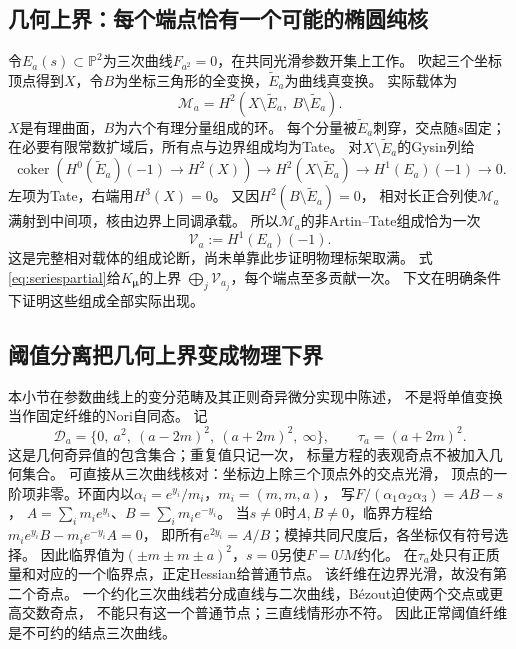 \documentclass[11pt,a4paper]{ctexart}
\theoremstyle{cnplain}\newtheorem{theorem}{定理}[section]
\theoremstyle{definition}\newtheorem{definition}[theorem]{定义}
\theoremstyle{remark}\newtheorem{remark}[theorem]{注}
\begin{document}
\subsection{几何上界：每个端点恰有一个可能的椭圆纯核}
令$E_a(s)\subset\mathbb P^2$为三次曲线$F_{a^2}=0$，在共同光滑参数开集上工作。
吹起三个坐标顶点得到$X$，令$B$为坐标三角形的全变换，$\widetilde E_a$为曲线真变换。
实际载体为
\[
 \mathcal M_a
 =H^2(X\setminus\widetilde E_a,\ B\setminus\widetilde E_a).
\]
$X$是有理曲面，$B$为六个有理分量组成的环。
每个分量被$\widetilde E_a$刺穿，交点随$s$固定；
在必要有限常数扩域后，所有点与边界组成均为Tate。
对$X\setminus\widetilde E_a$的Gysin列给
\[
 \operatorname{coker}\!\left(H^0(\widetilde E_a)(-1)\to H^2(X)\right)
 \longrightarrow H^2(X\setminus\widetilde E_a)
 \longrightarrow H^1(E_a)(-1)\longrightarrow0.
\]
左项为Tate，右端用$H^3(X)=0$。
又因$H^2(B\setminus\widetilde E_a)=0$，
相对长正合列使$\mathcal M_a$满射到中间项，核由边界上同调承载。
所以$\mathcal M_a$的非Artin--Tate组成恰为一次
\[
 \mathcal V_a:=H^1(E_a)(-1).
\]
这是完整相对载体的组成论断，尚未单靠此步证明物理标架取满。
式\eqref{eq:seriespartial}给$K_{\boldsymbol\mu}$的上界
$\bigoplus_j\mathcal V_{a_j}$，每个端点至多贡献一次。
下文在明确条件下证明这些组成全部实际出现。

\subsection{阈值分离把几何上界变成物理下界}
本小节在参数曲线上的变分范畴及其正则奇异微分实现中陈述，
不是将单值变换当作固定纤维的Nori自同态。
记
\[
 \mathcal D_a=\{0,\ a^2,\ (a-2m)^2,\ (a+2m)^2,\ \infty\},
 \qquad \tau_a=(a+2m)^2.
\]
这是几何奇异值的包含集合；重复值只记一次，
标量方程的表观奇点不被加入几何集合。
可直接从三次曲线核对：坐标边上除三个顶点外的交点光滑，
顶点的一阶项非零。环面内以$\alpha_i=e^{y_i}/m_i$，$m_i=(m,m,a)$，
写$F/(\alpha_1\alpha_2\alpha_3)=AB-s$，
$A=\sum_i m_i e^{y_i}$、$B=\sum_i m_i e^{-y_i}$。
当$s\ne0$时$A,B\ne0$，临界方程给
$m_i e^{y_i}B-m_i e^{-y_i}A=0$，
即所有$e^{2y_i}=A/B$；模掉共同尺度后，各坐标仅有符号选择。
因此临界值为$(\pm m\pm m\pm a)^2$，$s=0$另使$F=UM$约化。
在$\tau_a$处只有正质量和对应的一个临界点，正定Hessian给普通节点。
该纤维在边界光滑，故没有第二个奇点。
一个约化三次曲线若分成直线与二次曲线，Bézout迫使两个交点或更高交数奇点，
不能只有这一个普通节点；三直线情形亦不符。
因此正常阈值纤维是不可约的结点三次曲线。
\end{document}
